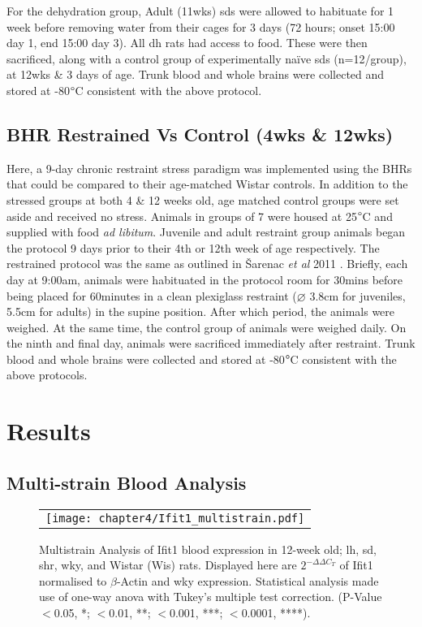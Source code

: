 For the dehydration group, Adult (11wks) \acrshort{sd}s were allowed to habituate for 1 week before removing water from their cages for 3 days (72 hours; onset 15:00 day 1, end 15:00 day 3). All \acrshort{dh} rats had access to food. These were then sacrificed, along with a control group of experimentally naïve \acrshort{sd}s (n=12/group), at 12wks \& 3 days of age. Trunk blood and whole brains were collected and stored at -80$\degree$C consistent with the above protocol. 

\subsection{BHR Restrained Vs Control (4wks \& 12wks)}

Here, a 9-day chronic restraint stress paradigm was implemented using the BHRs that could be compared to their age-matched Wistar controls. In addition to the stressed groups at both 4 \& 12 weeks old, age matched control groups were set aside and received no stress. Animals in groups of 7 were housed at 25$\degree$C and supplied with food \textit{ad libitum}. Juvenile and adult restraint group animals began the protocol 9 days prior to their 4th or 12th week of age respectively. The restrained protocol was the same as outlined in Šarenac \textit{et al} 2011 \cite{10.1371/journal.pone.0006162}. Briefly, each day at 9:00am, animals were habituated in the protocol room for 30mins before being placed for 60minutes in a clean plexiglass restraint ($\diameter$ 3.8cm for juveniles, 5.5cm for adults) in the supine position. After which period, the animals were weighed. At the same time, the control group of animals were weighed daily. On the ninth and final day, animals were sacrificed immediately after restraint. Trunk blood and whole brains were collected and stored at -80$\degree$C consistent with the above protocols.

\section{Results}

\subsection{Multi-strain Blood Analysis}

\begin{figure*}
\centering
\begin{tabular}{c}
  \texttt{[image: chapter4/Ifit1\_multistrain.pdf]} \\
\end{tabular}
\caption[Multistrain Analysis of Ifit1 blood expression]{Multistrain Analysis of Ifit1 blood expression in 12-week old; \acrfull{lh}, \acrfull{sd}, \acrfull{shr}, \acrfull{wky}, and Wistar (Wis)  rats. Displayed here are $2^{-\Delta\Delta C_{T}}$ of Ifit1 normalised to $\beta$-Actin and \acrshort{wky} expression. Statistical analysis made use of one-way \acrfull{anova} with Tukey's multiple test correction. (P-Value $<$0.05, *; $<$0.01, **; $<$0.001, ***;  $<$0.0001, ****).}
\label{fig:multistrain}
\end{figure*}

